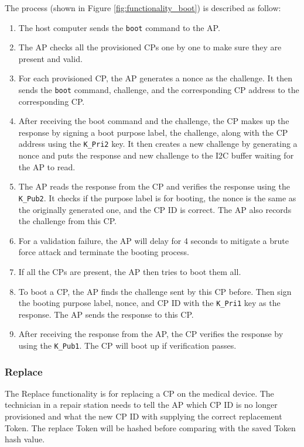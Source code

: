 \documentclass[11pt,oneside,onecolumn,letterpaper]{article}
\begin{document}
	The process (shown in Figure \ref{fig:functionality_boot}) is described as follow:
	\begin{enumerate}
		\item The host computer sends the \texttt{boot} command to the AP.
		\item The AP checks all the provisioned CPs one by one to make sure they are present and valid.
		\item For each provisioned CP,
		the AP generates a nonce as the challenge.
		It then sends the \texttt{boot} command,
		challenge,
		and the corresponding CP address to the corresponding CP.
		\item After receiving the boot command and the challenge,
		the CP makes up the response by signing a boot purpose label,
		the challenge,
		along with the CP address using the \texttt{K\_Pri2} key.
		It then creates a new challenge by generating a nonce and puts the response and new challenge to the I2C buffer waiting for the AP to read.
		\item The AP reads the response from the CP and verifies the response using the \texttt{K\_Pub2}.
		It checks if the purpose label is for booting,
		the nonce is the same as the originally generated one,
		and the CP ID is correct.
		The AP also records the challenge from this CP.
		\item For a validation failure,
		the AP will delay for 4 seconds to mitigate a brute force attack and terminate the booting process.
		\item If all the CPs are present,
		the AP then tries to boot them all.
		\item To boot a CP,
		the AP finds the challenge sent by this CP before.
		Then sign the booting purpose label, nonce, and CP ID with the \texttt{K\_Pri1} key as the response.
		The AP sends the response to this CP.
		\item After receiving the response from the AP,
		the CP verifies the response by using the \texttt{K\_Pub1}.
		The CP will boot up if verification passes.
	\end{enumerate}
	
	\subsubsection{Replace}
	The Replace functionality is for replacing a CP on the medical device.
	The technician in a repair station needs to tell the AP which CP ID is no longer provisioned and what the new CP ID with supplying the correct replacement Token.
	The replace Token will be hashed before comparing with the saved Token hash value.
	
\end{document}
